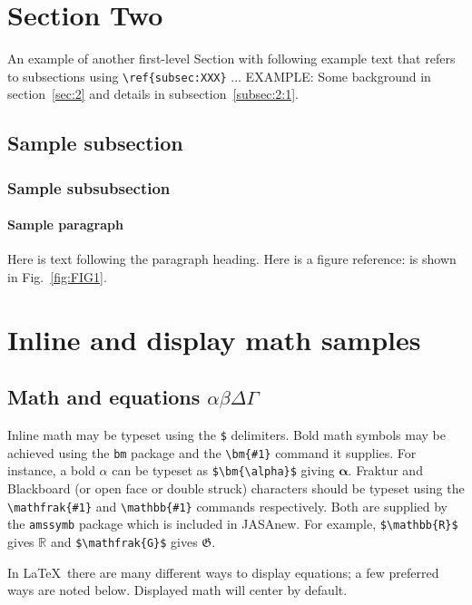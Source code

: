 \documentclass[reprint]{JASAnew}
\begin{document}
\section{\label{sec:2} Section Two}
An example of another first-level Section with following example text that refers to subsections using 
\verb+\ref{subsec:XXX}+ ...  EXAMPLE: Some background in
section~\ref{sec:2} and details  in subsection~\ref{subsec:2:1}. 

\subsection{\label{subsec:2:1} Sample subsection}

\subsubsection{Sample subsubsection\label{subsubsec:1}}
\eject

\paragraph{Sample paragraph}Here is text following the paragraph
heading.
Here is a figure reference: is shown in Fig.~\ref{fig:FIG1}.


\section{Inline and display math samples\label{sec:3}}

\subsection{\label{subsec:3:3} Math and equations $\alpha\beta\Delta\Gamma$}
Inline math may be typeset using the \verb+$+ delimiters. Bold math
symbols may be achieved using the \verb+bm+ package and the
\verb+\bm{#1}+ command it supplies. For instance, a bold $\alpha$ can
be typeset as \verb+$\bm{\alpha}$+ giving $\bm{\alpha}$. Fraktur and
Blackboard (or open face or double struck) characters should be
typeset using the \verb+\mathfrak{#1}+ and \verb+\mathbb{#1}+ commands
respectively. Both are supplied by the \texttt{amssymb} package which
is included in JASAnew. For
example, \verb+$\mathbb{R}$+ gives $\mathbb{R}$ and
\verb+$\mathfrak{G}$+ gives $\mathfrak{G}$.

In \LaTeX\ there are many different ways to display equations; a
few preferred ways are noted below. Displayed math will center by
default. 
\end{document}
